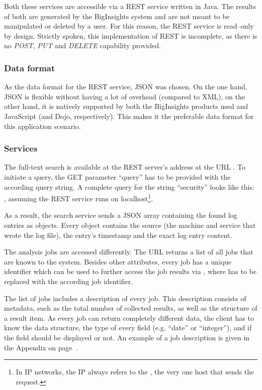 Both these services are accessible via a REST service written in Java. The results of both are generated by the BigInsights system and are not meant to be manipulated or deleted by a user. For this reason, the REST service is read--only by design. Strictly spoken, this implementation of REST is incomplete, as there is no \emph{POST}, \emph{PUT} and \emph{DELETE} capability provided.

\subsubsection{Data format}
As the data format for the REST service, JSON was chosen. On the one hand, JSON is flexible without having a lot of overhead (compared to XML), on the other hand, it is natively supported by both the BigInsights products used and JavaScript (and Dojo, respectively). This makes it the preferable data format for this application scenario.

\subsubsection{Services}
The full-text search is available at the REST server's address at the URL . To initiate a query, the GET parameter ``query'' has to be provided with the according query string. A complete query for the string ``security'' looks like this: , assuming the REST service runs on localhost\footnote{In IP networks, the IP  always refers to the , the very one host that sends the request.}.

As a result, the search service sends a JSON array containing the found log entries as objects. Every object contains the source (the machine and service that wrote the log file), the entry's \gls{timestamp} and the exact log entry content.

The analysis jobs are accessed differently. The URL  returns a list of all jobs that are known to the system. Besides other attributes, every job has a unique identifier which can be used to further access the job results via , where  has to be replaced with the according job identifier.

The list of jobs includes a description of every job. This description consists of metadata, such as the total number of collected results, as well as the structure of a result item. As every job can return completely different data, the client has to know the data structure, the type of every field (e.g. ``date'' or ``integer''), and if the field should be displayed or not. An example of a job description is given in the Appendix on page~\pageref{app:json}.

